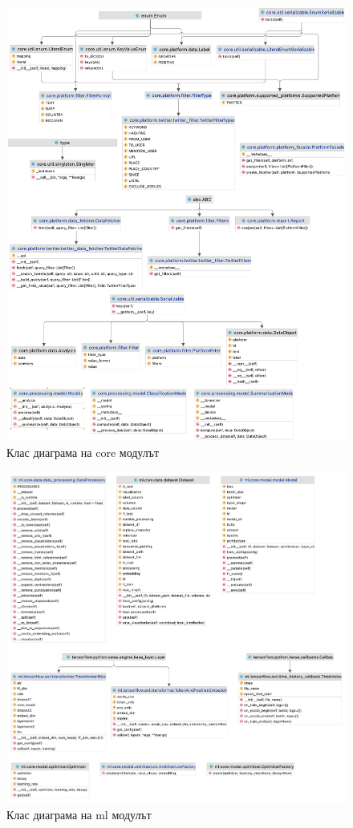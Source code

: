 \documentclass{article}
\newcounter{subsubsubsection}[subsubsection]
\begin{document}

    \newpage\begin{figure}[H]
                \centering
                \captionsetup{justification=centering}
                \includegraphics[width=450px, keepaspectratio]{chapter-04/core.png}
                \caption{Клас диаграма на core модулът}
    \end{figure}


    \begin{figure}[H]
        \centering
        \captionsetup{justification=centering}
        \includegraphics[width=450px, keepaspectratio]{chapter-04/ml.png}
        \caption{Клас диаграма на ml модулът}
    \end{figure}
\end{document}
